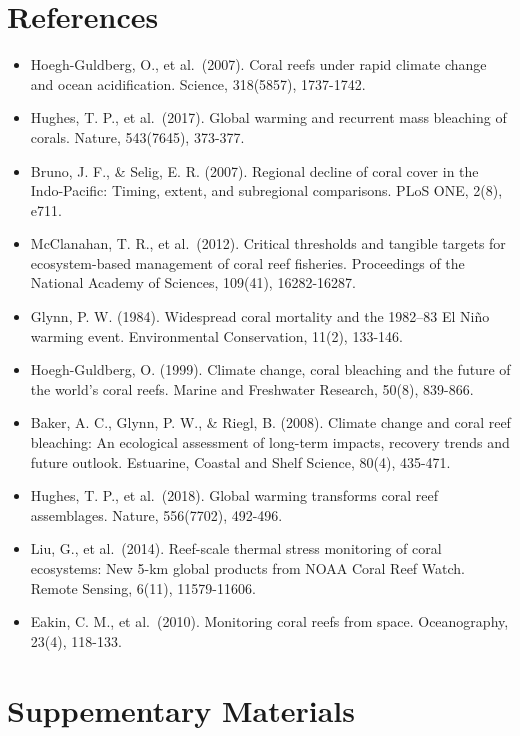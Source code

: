 \documentclass[
  letterpaper,
  DIV=11,
  numbers=noendperiod]{scrartcl}
\providecommand{\tightlist}{%
  \setlength{\itemsep}{0pt}\setlength{\parskip}{0pt}}\usepackage{longtable,booktabs,array}
\begin{document}
\pagebreak

\section{References}\label{references}

\begin{itemize}
\tightlist
\item
  Hoegh-Guldberg, O., et al.~(2007). Coral reefs under rapid climate
  change and ocean acidification. Science, 318(5857), 1737-1742.
\item
  Hughes, T. P., et al.~(2017). Global warming and recurrent mass
  bleaching of corals. Nature, 543(7645), 373-377.
\item
  Bruno, J. F., \& Selig, E. R. (2007). Regional decline of coral cover
  in the Indo-Pacific: Timing, extent, and subregional comparisons. PLoS
  ONE, 2(8), e711.
\item
  McClanahan, T. R., et al.~(2012). Critical thresholds and tangible
  targets for ecosystem-based management of coral reef fisheries.
  Proceedings of the National Academy of Sciences, 109(41), 16282-16287.
\item
  Glynn, P. W. (1984). Widespread coral mortality and the 1982--83 El
  Niño warming event. Environmental Conservation, 11(2), 133-146.
\item
  Hoegh-Guldberg, O. (1999). Climate change, coral bleaching and the
  future of the world's coral reefs. Marine and Freshwater Research,
  50(8), 839-866.
\item
  Baker, A. C., Glynn, P. W., \& Riegl, B. (2008). Climate change and
  coral reef bleaching: An ecological assessment of long-term impacts,
  recovery trends and future outlook. Estuarine, Coastal and Shelf
  Science, 80(4), 435-471.
\item
  Hughes, T. P., et al.~(2018). Global warming transforms coral reef
  assemblages. Nature, 556(7702), 492-496.
\item
  Liu, G., et al.~(2014). Reef-scale thermal stress monitoring of coral
  ecosystems: New 5-km global products from NOAA Coral Reef Watch.
  Remote Sensing, 6(11), 11579-11606.
\item
  Eakin, C. M., et al.~(2010). Monitoring coral reefs from space.
  Oceanography, 23(4), 118-133.
\end{itemize}

\pagebreak

\section{Suppementary Materials}\label{suppementary-materials}
\end{document}
